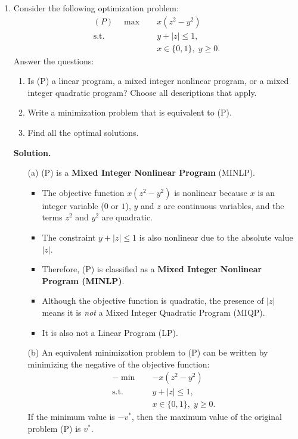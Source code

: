 \documentclass{article}
\begin{document}
\begin{enumerate}
\item Consider the following optimization problem:
\begin{align*}
    (P)\quad \max \quad & x (z^2 - y^2) \\
    \text{s.t.}\quad & y + |z|\le 1, \\
    & x \in \{0,1\}, \; y\ge 0.
\end{align*}
Answer the questions:
\begin{enumerate}
    \item Is (P) a linear program, a mixed integer nonlinear program, or a mixed integer quadratic program? Choose all descriptions that apply.
    
    \item Write a minimization problem that is equivalent to (P).
    
    \item Find all the optimal solutions.
\end{enumerate}

\hrulefill

\textbf{Solution.}
\begin{enumerate}
    \item[(a)] (P) is a \textbf{Mixed Integer Nonlinear Program} (MINLP).

    \begin{itemize}
        \item The objective function $x(z^2 - y^2)$ is nonlinear because $x$ is an integer variable ($0$ or $1$), $y$ and $z$ are continuous variables, and the terms $z^2$ and $y^2$ are quadratic.
        \item The constraint $y + |z| \le 1$ is also nonlinear due to the absolute value $|z|$.
        \item Therefore, (P) is classified as a \textbf{Mixed Integer Nonlinear Program (MINLP)}.
        \item Although the objective function is quadratic, the presence of $|z|$ means it is \emph{not} a Mixed Integer Quadratic Program (MIQP).
        \item It is also not a Linear Program (LP).
    \end{itemize}

    \item[(b)] An equivalent minimization problem to (P) can be written by minimizing the negative of the objective function:
    \begin{align*}
        -\min \quad & -x(z^2 - y^2) \\
        \text{s.t.}\quad & y + |z| \le 1, \\
        & x \in \{0,1\},\; y \ge 0.
    \end{align*}
    If the minimum value is $-v^\ast$, then the maximum value of the original problem (P) is $v^\ast$.


\end{enumerate}
\end{enumerate}
\end{document}
